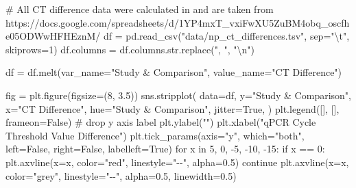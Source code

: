 \documentclass[
  letterpaper,
  DIV=11,
  numbers=noendperiod]{scrartcl}
\newenvironment{Shaded}{\begin{snugshade}}{\end{snugshade}}
\newcommand{\BuiltInTok}[1]{\textcolor[rgb]{0.00,0.23,0.31}{#1}}
\newcommand{\CharTok}[1]{\textcolor[rgb]{0.13,0.47,0.30}{#1}}
\newcommand{\CommentTok}[1]{\textcolor[rgb]{0.37,0.37,0.37}{#1}}
\newcommand{\ControlFlowTok}[1]{\textcolor[rgb]{0.00,0.23,0.31}{#1}}
\newcommand{\DecValTok}[1]{\textcolor[rgb]{0.68,0.00,0.00}{#1}}
\newcommand{\FloatTok}[1]{\textcolor[rgb]{0.68,0.00,0.00}{#1}}
\newcommand{\KeywordTok}[1]{\textcolor[rgb]{0.00,0.23,0.31}{#1}}
\newcommand{\NormalTok}[1]{\textcolor[rgb]{0.00,0.23,0.31}{#1}}
\newcommand{\OperatorTok}[1]{\textcolor[rgb]{0.37,0.37,0.37}{#1}}
\newcommand{\StringTok}[1]{\textcolor[rgb]{0.13,0.47,0.30}{#1}}
\newcommand{\VariableTok}[1]{\textcolor[rgb]{0.07,0.07,0.07}{#1}}
\begin{document}
\begin{Shaded}
\begin{Highlighting}[]
\CommentTok{\# All CT difference data were calculated in and are taken from https://docs.google.com/spreadsheets/d/1YP4mxT\_vxiFwXU5ZuBM4obq\_oscfhe05ODWwHFHEznM/}
\NormalTok{df }\OperatorTok{=}\NormalTok{ pd.read\_csv(}\StringTok{"data/np\_ct\_differences.tsv"}\NormalTok{, sep}\OperatorTok{=}\StringTok{"}\CharTok{\textbackslash{}t}\StringTok{"}\NormalTok{, skiprows}\OperatorTok{=}\DecValTok{1}\NormalTok{)}
\NormalTok{df.columns }\OperatorTok{=}\NormalTok{ df.columns.}\BuiltInTok{str}\NormalTok{.replace(}\StringTok{", "}\NormalTok{, }\StringTok{"}\CharTok{\textbackslash{}n}\StringTok{"}\NormalTok{)}

\NormalTok{df }\OperatorTok{=}\NormalTok{ df.melt(var\_name}\OperatorTok{=}\StringTok{"Study \& Comparison"}\NormalTok{, value\_name}\OperatorTok{=}\StringTok{"CT Difference"}\NormalTok{)}

\NormalTok{fig }\OperatorTok{=}\NormalTok{ plt.figure(figsize}\OperatorTok{=}\NormalTok{(}\DecValTok{8}\NormalTok{, }\FloatTok{3.5}\NormalTok{))}
\NormalTok{sns.stripplot(}
\NormalTok{    data}\OperatorTok{=}\NormalTok{df,}
\NormalTok{    y}\OperatorTok{=}\StringTok{"Study \& Comparison"}\NormalTok{,}
\NormalTok{    x}\OperatorTok{=}\StringTok{"CT Difference"}\NormalTok{,}
\NormalTok{    hue}\OperatorTok{=}\StringTok{"Study \& Comparison"}\NormalTok{,}
\NormalTok{    jitter}\OperatorTok{=}\VariableTok{True}\NormalTok{,}
\NormalTok{)}
\NormalTok{plt.legend([], [], frameon}\OperatorTok{=}\VariableTok{False}\NormalTok{)}
\CommentTok{\# drop y axis label}
\NormalTok{plt.ylabel(}\StringTok{""}\NormalTok{)}
\NormalTok{plt.xlabel(}\StringTok{"qPCR Cycle Threshold Value Difference"}\NormalTok{)}
\NormalTok{plt.tick\_params(axis}\OperatorTok{=}\StringTok{"y"}\NormalTok{, which}\OperatorTok{=}\StringTok{"both"}\NormalTok{, left}\OperatorTok{=}\VariableTok{False}\NormalTok{, right}\OperatorTok{=}\VariableTok{False}\NormalTok{, labelleft}\OperatorTok{=}\VariableTok{True}\NormalTok{)}
\ControlFlowTok{for}\NormalTok{ x }\KeywordTok{in} \DecValTok{5}\NormalTok{, }\DecValTok{0}\NormalTok{, }\OperatorTok{{-}}\DecValTok{5}\NormalTok{, }\OperatorTok{{-}}\DecValTok{10}\NormalTok{, }\OperatorTok{{-}}\DecValTok{15}\NormalTok{:}
    \ControlFlowTok{if}\NormalTok{ x }\OperatorTok{==} \DecValTok{0}\NormalTok{:}
\NormalTok{        plt.axvline(x}\OperatorTok{=}\NormalTok{x, color}\OperatorTok{=}\StringTok{"red"}\NormalTok{, linestyle}\OperatorTok{=}\StringTok{"{-}{-}"}\NormalTok{, alpha}\OperatorTok{=}\FloatTok{0.5}\NormalTok{)}
        \ControlFlowTok{continue}
\NormalTok{    plt.axvline(x}\OperatorTok{=}\NormalTok{x, color}\OperatorTok{=}\StringTok{"grey"}\NormalTok{, linestyle}\OperatorTok{=}\StringTok{"{-}{-}"}\NormalTok{, alpha}\OperatorTok{=}\FloatTok{0.5}\NormalTok{, linewidth}\OperatorTok{=}\FloatTok{0.5}\NormalTok{)}


\end{Highlighting}
\end{Shaded}
\end{document}
